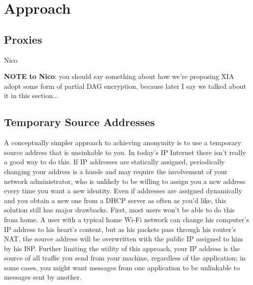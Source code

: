 \documentclass{article}
\begin{document}
\section{Approach}
\label{approach}

\subsection{Proxies}
\label{proxies}
Nico

{\bf NOTE to Nico}: you should say something about how we're proposing XIA adopt some form of partial DAG encryption, because later I say we talked about it in this section...

\subsection{Temporary Source Addresses}
\label{temp-ids}
A conceptually simpler approach to achieving anonymity is to use a temporary source address that is unsinkable to you. In today's IP Internet there isn't really a good way to do this. If IP addresses are statically assigned, periodically changing your address is a hassle and may require the involvement of your network administrator, who is unlikely to be willing to assign you a new address every time you want a new identity. Even if addresses are assigned dynamically and you obtain a new one from a DHCP server as often as you'd like, this solution still has major drawbacks. First, most users won't be able to do this from home. A user with a typical home Wi-Fi network can change his computer's IP address to his heart's content, but as his packets pass through his router's NAT, the source address will be overwritten with the public IP assigned to him by his ISP. Further limiting the utility of this approach, your IP address is the source of all traffic you send from your machine, regardless of the application; in some cases, you might want messages from one application to be unlinkable to messages sent by another.
\end{document}
